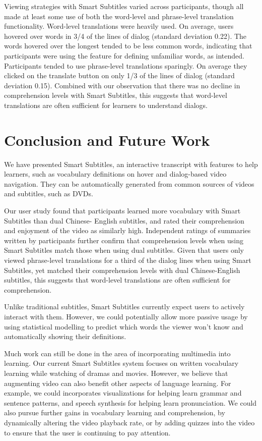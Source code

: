 \documentclass{sigchi}
\begin{document}
Viewing strategies with Smart Subtitles varied across
participants, though all made at least some use of both
the word-level and phrase-level translation functionality.
Word-level translations were heavily used. On average,
users hovered over words in 3/4 of the lines of dialog
(standard deviation 0.22).
The words hovered over the longest tended to be less
common words, indicating that participants were using
the feature for defining unfamiliar words, as intended.
Participants tended to use phrase-level translations
sparingly. On average they clicked on the translate
button on only 1/3 of the lines of dialog
(standard deviation 0.15).
Combined with our observation that there was no decline in
comprehension levels with Smart Subtitles, this suggests
that word-level translations are often sufficient for
learners to understand dialogs.

\section{Conclusion and Future Work}

We have presented Smart Subtitles, an interactive
transcript with features to help learners, such as vocabulary
definitions on hover and dialog-based video navigation.
They can be automatically generated from
common sources of videos and subtitles, such as DVDs.

Our user study found that participants learned more
vocabulary with Smart Subtitles than dual Chinese-
English subtitles, and rated their comprehension and
enjoyment of the video as similarly high.
Independent ratings of summaries written by participants
further confirm that comprehension levels when using Smart Subtitles
match those when using dual subtitles.
Given that users only viewed phrase-level translations for a
third of the dialog lines when using Smart Subtitles,
yet matched their comprehension levels with dual Chinese-English subtitles,
this suggests that word-level translations are often sufficient for
comprehension.

Unlike traditional subtitles, Smart Subtitles currently expect users to actively interact with them. However, we could potentially allow more
passive usage by using statistical modelling to predict which words the viewer
won’t know and automatically showing their definitions.

Much work can still be done in the area of incorporating multimedia into learning. Our current Smart Subtitles system focuses on written vocabulary learning while watching of dramas and movies.
However, we believe that augmenting video can also benefit other aspects of language learning. For example, we could
incorporates visualizations for helping learn grammar and sentence patterns,
and speech synthesis for helping learn pronunciation. We could also 
pursue further gains in vocabulary learning and comprehension,
by dynamically altering the video playback rate, or by adding
quizzes into the video to ensure that the user is continuing to pay attention.
\end{document}
